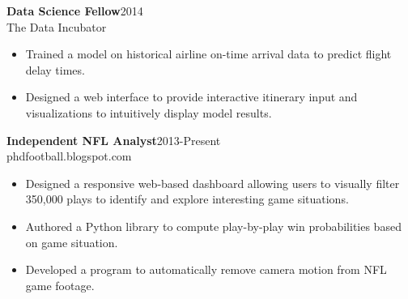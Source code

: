 \documentclass[11pt]{res}
\begin{document}
\begin{resume}
{\bf Data Science Fellow}\hfill\mbox{2014}\\
The Data Incubator
                  \vspace* {0.01 in}\begin{itemize} \itemsep -2pt
                    \item Trained a model on
                      historical airline on-time arrival data to predict flight
                      delay times.
                    \item Designed a web interface to provide interactive itinerary
                      input and visualizations to intuitively
                      display model results.
                    \end{itemize}
\vspace{-0.15in}

{\bf Independent NFL Analyst}\hfill\mbox{2013-Present}\\
phdfootball.blogspot.com
                  \vspace* {0.01 in}\begin{itemize} \itemsep -2pt
                    \item Designed a responsive web-based dashboard
                      allowing users to visually filter 350,000
                      plays to identify and explore
                      interesting game situations.
                    \item Authored a Python library to compute
                      play-by-play win probabilities based on game situation.
                    \item Developed a program to automatically remove
                      camera motion from NFL game footage. 

\end{itemize}
\end{resume}
\end{document}
